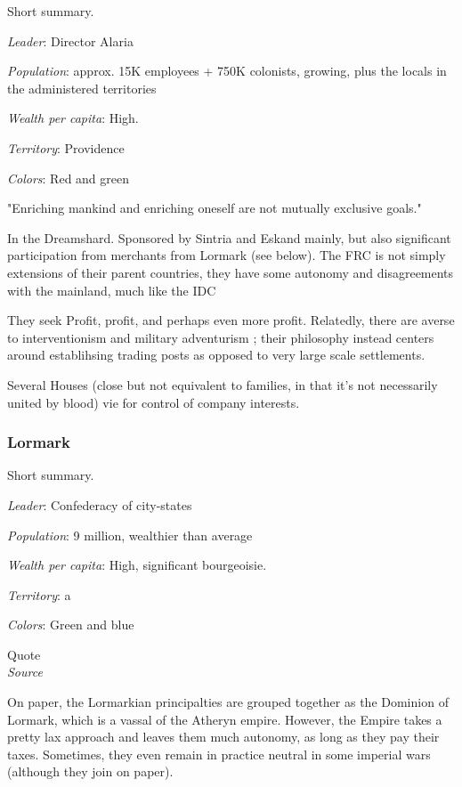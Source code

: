 Short summary.

\textit{Leader}: Director Alaria

\textit{Population}: approx. 15K employees + 750K colonists, growing, plus the locals in the administered territories

\textit{Wealth per capita}: High.

\textit{Territory}: Providence
    
\textit{Colors}: Red and green


\begin{rpg-quotebox}
"Enriching mankind and enriching oneself are not mutually exclusive goals."
\end{rpg-quotebox}


In the Dreamshard. Sponsored by Sintria and Eskand mainly, but also significant participation from merchants from Lormark (see below).  
The FRC is not simply extensions of their parent countries, they have some autonomy and disagreements with the mainland, much like the IDC


They seek Profit, profit, and perhaps even more profit. Relatedly, there are averse to interventionism and military adventurism ; their philosophy instead centers around establihsing trading posts as opposed to very large scale settlements.

Several Houses (close but not equivalent to families, in that it's not necessarily united by blood) vie for control of company interests.



\subsubsection{Lormark}

Short summary.

\textit{Leader}: Confederacy of city-states

\textit{Population}: 9 million, wealthier than average

\textit{Wealth per capita}: High, significant bourgeoisie.

\textit{Territory}: a
    
\textit{Colors}: Green and blue


\begin{rpg-quotebox}
Quote \\ \textendash \textit{Source}
\end{rpg-quotebox}

On paper, the Lormarkian principalties are grouped together as the Dominion of Lormark, which is a vassal of the Atheryn empire. However, the Empire takes a pretty lax approach and leaves them much autonomy, as long as they pay their taxes. Sometimes, they even remain in practice neutral in some imperial wars (although they join on paper). 

